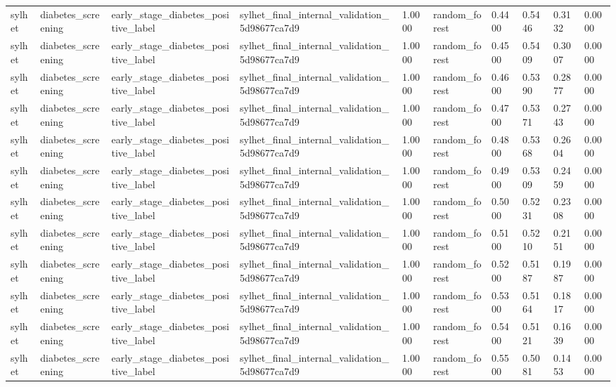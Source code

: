 \begin{tabular}{llllllllll}
sylhet & diabetes\_screening & early\_stage\_diabetes\_positive\_label & sylhet\_final\_internal\_validation\_5d98677ca7d9 & 1.0000 & random\_forest & 0.4400 & 0.5446 & 0.3132 & 0.0000 \\
sylhet & diabetes\_screening & early\_stage\_diabetes\_positive\_label & sylhet\_final\_internal\_validation\_5d98677ca7d9 & 1.0000 & random\_forest & 0.4500 & 0.5409 & 0.3007 & 0.0000 \\
sylhet & diabetes\_screening & early\_stage\_diabetes\_positive\_label & sylhet\_final\_internal\_validation\_5d98677ca7d9 & 1.0000 & random\_forest & 0.4600 & 0.5390 & 0.2877 & 0.0000 \\
sylhet & diabetes\_screening & early\_stage\_diabetes\_positive\_label & sylhet\_final\_internal\_validation\_5d98677ca7d9 & 1.0000 & random\_forest & 0.4700 & 0.5371 & 0.2743 & 0.0000 \\
sylhet & diabetes\_screening & early\_stage\_diabetes\_positive\_label & sylhet\_final\_internal\_validation\_5d98677ca7d9 & 1.0000 & random\_forest & 0.4800 & 0.5368 & 0.2604 & 0.0000 \\
sylhet & diabetes\_screening & early\_stage\_diabetes\_positive\_label & sylhet\_final\_internal\_validation\_5d98677ca7d9 & 1.0000 & random\_forest & 0.4900 & 0.5309 & 0.2459 & 0.0000 \\
sylhet & diabetes\_screening & early\_stage\_diabetes\_positive\_label & sylhet\_final\_internal\_validation\_5d98677ca7d9 & 1.0000 & random\_forest & 0.5000 & 0.5231 & 0.2308 & 0.0000 \\
sylhet & diabetes\_screening & early\_stage\_diabetes\_positive\_label & sylhet\_final\_internal\_validation\_5d98677ca7d9 & 1.0000 & random\_forest & 0.5100 & 0.5210 & 0.2151 & 0.0000 \\
sylhet & diabetes\_screening & early\_stage\_diabetes\_positive\_label & sylhet\_final\_internal\_validation\_5d98677ca7d9 & 1.0000 & random\_forest & 0.5200 & 0.5187 & 0.1987 & 0.0000 \\
sylhet & diabetes\_screening & early\_stage\_diabetes\_positive\_label & sylhet\_final\_internal\_validation\_5d98677ca7d9 & 1.0000 & random\_forest & 0.5300 & 0.5164 & 0.1817 & 0.0000 \\
sylhet & diabetes\_screening & early\_stage\_diabetes\_positive\_label & sylhet\_final\_internal\_validation\_5d98677ca7d9 & 1.0000 & random\_forest & 0.5400 & 0.5121 & 0.1639 & 0.0000 \\
sylhet & diabetes\_screening & early\_stage\_diabetes\_positive\_label & sylhet\_final\_internal\_validation\_5d98677ca7d9 & 1.0000 & random\_forest & 0.5500 & 0.5081 & 0.1453 & 0.0000 \\

\end{tabular}

